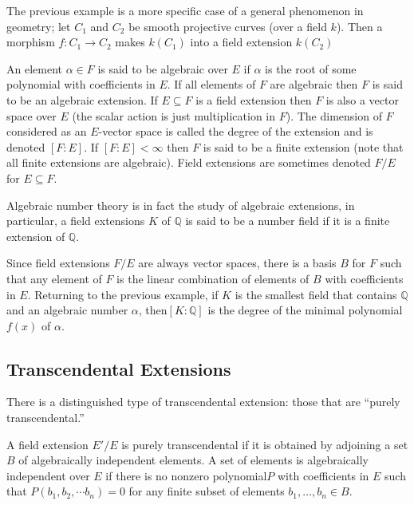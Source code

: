 \begin{example} The previous example is a more specific case of a general
phenomenon in geometry; let $C_1$ and $C_2$ be smooth projective curves (over a
field $k$). Then a morphism $f:C_1\rightarrow C_2$ makes $k(C_1)$ into a field
extension $k(C_2)$ 
\end{example}

\begin{definition}An element $\alpha\in F$ is said to be algebraic over $E$ if
$\alpha$ is the root of some polynomial with coefficients in $E$. If all
elements of $F$ are algebraic then $F$ is said to be an algebraic extension. If
$E\subseteq F$ is a field extension then $F$ is also a vector space over $E$
(the scalar action is just multiplication in $F$). The dimension of $F$
considered as an $E$-vector space is called the degree of the extension and is
denoted $[F:E]$. If $[F:E]<\infty$ then $F$ is said to be a finite extension
(note that all finite extensions are algebraic). Field extensions are sometimes
denoted $F/E$ for $E\subseteq F$.
\end{definition}

Algebraic number theory is in fact the study of algebraic extensions, in
particular, a field extensions $K$ of $\mathbb{Q}$ is said to be a number field
if it is a finite extension of $\mathbb{Q}$.

Since field extensions $F/E$ are always vector spaces, there is a basis $B$ for
$F$ such that any element of $F$ is the linear combination of elements of $B$
with coefficients in $E$. Returning to the previous example, if $K$ is the
smallest field that contains $\mathbb{Q}$ and an algebraic number $\alpha$,
then$[K:\mathbb{Q}]$ is the degree of the minimal polynomial $f(x)$ of $\alpha$.
\subsection{Transcendental Extensions}
There is a distinguished type of transcendental extension: those that are
``purely transcendental.'' 
\begin{definition} A field extension $E'/E$ is purely transcendental if it is
obtained by adjoining a set $B$ of algebraically independent elements. A set of
elements is algebraically independent over $E$ if there is no nonzero polynomial$P$
with coefficients in $E$ such
that $P(b_1,b_2,\cdots b_n)=0$ for any finite subset of elements $b_1, \dots,
b_n \in B$.
\end{definition}

